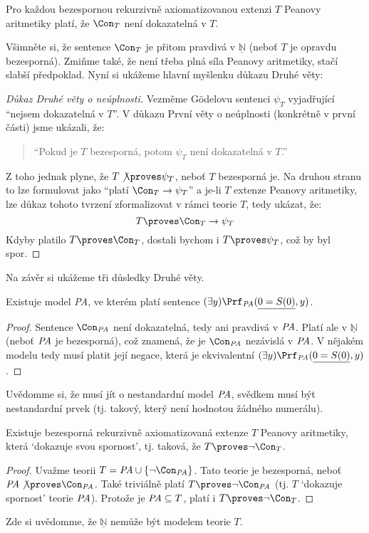 \begin{theorem}
Pro každou bezespornou rekurzivně axiomatizovanou extenzi $T$ Peanovy aritmetiky platí, že $\Con_T$ není dokazatelná v $T$.    
\end{theorem}

Všimněte si, že sentence $\Con_T$ je přitom pravdivá v $\underline{\mathbb N}$ (neboť $T$ je opravdu bezesporná). Zmiňme také, že není třeba plná síla Peanovy aritmetiky, stačí slabší předpoklad. Nyní si ukážeme hlavní myšlenku důkazu Druhé věty:

\begin{proof}[Důkaz Druhé věty o neúplnosti]
Vezměme Gödelovu sentenci $\psi_T$ vyjadřující ``nejsem dokazatelná v $T$''. V důkazu První věty o neúplnosti (konkrétně v první části) jsme ukázali, že:
\begin{quote}
    ``Pokud je $T$ bezesporná, potom $\psi_T$ není dokazatelná v $T$.''
\end{quote}
Z toho jednak plyne, že $T\not\proves\psi_T$, neboť $T$ bezesporná je. Na druhou stranu to lze formulovat jako ``platí $\Con_T\to \psi_T$'' a je-li $T$ extenze Peanovy aritmetiky, lze důkaz tohoto tvrzení zformalizovat v rámci teorie $T$, tedy ukázat, že:
$$
T\proves\Con_T\to\psi_T
$$
Kdyby platilo $T\proves\Con_T$, dostali bychom i $T\proves\psi_T$, což by byl spor.
\end{proof}

Na závěr si ukážeme tři důsledky Druhé věty.

\begin{corollary}
    Existuje model {\it PA}, ve kterém platí sentence $(\exists y)\Prf_{\text{\it PA}}(\underline{0=S(0)},y)$.
\end{corollary}
\begin{proof}
    Sentence $\Con_{\text{\it PA}}$ není dokazatelná, tedy ani pravdivá v $\text{\it PA}$. Platí ale v $\underline{\mathbb N}$ (neboť $\text{\it PA}$ je bezesporná), což znamená, že je $\Con_{\text{\it PA}}$ nezávislá v $\text{\it PA}$. V nějakém modelu tedy musí platit její negace, která je ekvivalentní $(\exists y)\Prf_{\text{\it PA}}(\underline{0=S(0)},y)$.
        
\end{proof}
Uvědomme si, že musí jít o nestandardní model $\text{\it PA}$, svědkem musí být    
\alert{nestandardní} prvek (tj. takový, který není hodnotou žádného numerálu).

\begin{corollary}
    Existuje bezesporná rekurzivně axiomatizovaná extenze $T$    Peanovy aritmetiky, která `dokazuje svou spornost', tj. taková, že $T\proves \neg \Con_T$.
\end{corollary}
\begin{proof}
Uvažme teorii $T=\text{\it PA} \cup \{\neg \Con_{\text{\it PA}}\}$. Tato teorie je bezesporná, neboť $\text{\it PA}\not\proves\Con_{\text{\it PA}}$. Také triviálně platí $T\proves\neg\Con_{\text{\it PA}}$ (tj. $T$ `dokazuje spornost' teorie $\text{\it PA}$). Protože je $\text{\it PA}\subseteq T$, platí i $T\proves\neg\Con_T$.
\end{proof}
Zde si uvědomme, že $\underline{\mathbb{N}}$ nemůže být modelem teorie $T$.

